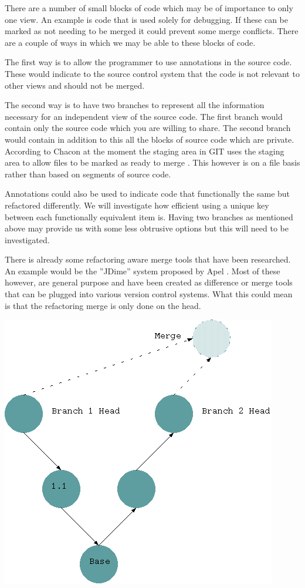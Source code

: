 \documentclass[12pt]{CRPITStyle}
\renewcommand{\cite}{\citep}
\begin{document}
There are a number of small blocks of code which may be of importance to only one view.  An example is code that is used solely for debugging. If these can be marked as not needing to be merged it could prevent some merge conflicts. There are a couple of ways in which we may be able to these blocks of code.

The first way is to allow the programmer to use annotations in the source code.  These would indicate to the source control system that the code is not relevant to other views and should not be merged.

The second way is to have two branches to represent all the information necessary for an independent view of the source code.  The first branch would contain only the source code which you are willing to share. The second branch would contain in addition to this all the blocks of source code which are private.  According to Chacon at the moment the staging area in GIT uses the staging area to allow files to be marked as ready to merge \cite{Chacon2009}. This however is on a file basis rather than based on segments of source code.

Annotations could also be used to indicate code that functionally the same but refactored differently. We will investigate how efficient using a unique key between each functionally equivalent item is. Having two branches as mentioned above may provide us with some less obtrusive options but this will need to be investigated.

There is already some refactoring aware merge tools that have been researched. An example would be the ''JDime'' system proposed by Apel \cite{Apel2011}. Most of these however, are general purpose and have been created as difference or merge tools that can be plugged into various version control systems. What this could mean is that the refactoring merge is only done on the head.

\begin{center}
\includegraphics[scale=0.5]{git-diag2}
\end{center}
\end{document}
